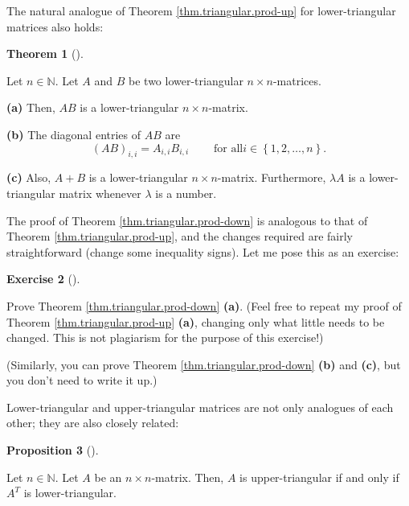 \documentclass[numbers=enddot,12pt,final,onecolumn,notitlepage]{scrartcl}%
\theoremstyle{definition}
\newtheorem{theo}{Theorem}[section]
\newenvironment{theorem}[1][]
{\begin{theo}[#1]\begin{leftbar}}
{\end{leftbar}\end{theo}}
\newtheorem{prop}[theo]{Proposition}
\newenvironment{proposition}[1][]
{\begin{prop}[#1]\begin{leftbar}}
{\end{leftbar}\end{prop}}
\newtheorem{exmp}[theo]{Exercise}
\newenvironment{exercise}[1][]
{\begin{exmp}[#1]\begin{leftbar}}
{\end{leftbar}\end{exmp}}
\begin{document}
The natural analogue of Theorem \ref{thm.triangular.prod-up} for
lower-triangular matrices also holds:

\begin{theorem}
\label{thm.triangular.prod-down}Let $n\in\mathbb{N}$. Let $A$ and $B$ be two
lower-triangular $n\times n$-matrices.

\textbf{(a)} Then, $AB$ is a lower-triangular $n\times n$-matrix.

\textbf{(b)} The diagonal entries of $AB$ are%
\[
\left(  AB\right)  _{i,i}=A_{i,i}B_{i,i}\ \ \ \ \ \ \ \ \ \ \text{for all
}i\in\left\{  1,2,\ldots,n\right\}  .
\]


\textbf{(c)} Also, $A+B$ is a lower-triangular $n\times n$-matrix.
Furthermore, $\lambda A$ is a lower-triangular matrix whenever $\lambda$ is a number.
\end{theorem}

The proof of Theorem \ref{thm.triangular.prod-down} is analogous to that of
Theorem \ref{thm.triangular.prod-up}, and the changes required are fairly
straightforward (change some inequality signs). Let me pose this as an exercise:

\begin{exercise}
\label{exe.thm.triangular.prod-down}Prove Theorem
\ref{thm.triangular.prod-down} \textbf{(a)}. (Feel free to repeat my proof of
Theorem \ref{thm.triangular.prod-up} \textbf{(a)}, changing only what little
needs to be changed. This is not plagiarism for the purpose of this exercise!)

(Similarly, you can prove Theorem \ref{thm.triangular.prod-down} \textbf{(b)}
and \textbf{(c)}, but you don't need to write it up.)
\end{exercise}

Lower-triangular and upper-triangular matrices are not only analogues of each
other; they are also closely related:

\begin{proposition}
\label{prop.triangular.UT=D}Let $n\in\mathbb{N}$. Let $A$ be an $n\times
n$-matrix. Then, $A$ is upper-triangular if and only if $A^{T}$ is lower-triangular.
\end{proposition}
\end{document}
